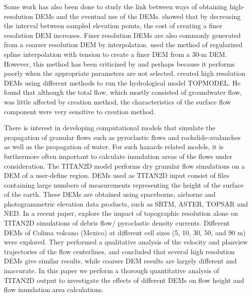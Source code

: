 \documentclass[12pt,letterpaper]{article}
\begin{document}
Some work has also been done to study the link between ways of
obtaining high-resolution DEMs and the eventual use of the
DEMs. \citet{Cochrane1999} showed that by decreasing the interval
between sampled elevation points, the cost of creating a finer
resolution DEM increases.  Finer resolution DEMs are also commonly
generated from a coarser resolution DEM by interpolation.
\citet{Mitasova1996} used the method of regularized spline
interpolation with tension to create a finer DEM from a 30-m
DEM. However, this method has been criticized by \citet{Zhang1994} and
\citet{Desmet1997} perhaps because it performs poorly when the
  appropriate parameters are not selected.  \citet{Wise2007} created
high resolution DEMs using different methods to run the hydrological
model TOPMODEL. He found that although the total flow, which mostly
consisted of groundwater flow, was little affected by creation method,
the characteristics of the surface flow component were very sensitive
to creation method.
 
There is interest in developing computational models that simulate the
propagation of granular flows such as pyroclastic flows and
rockslide-avalanches as well as the propagation of water.  For such
hazards related models, it is furthermore often important to calculate
inundation areas of the flows under consideration. The TITAN2D model
\citep{Patra2005} performs dry granular flow simulations on a DEM of a
user-define region. DEMs used as TITAN2D input consist of files
containing large numbers of measurements representing the height of
the surface of the earth. These DEMs are obtained using spaceborne,
airborne and photogrammetric elevation data products, such as SRTM,
ASTER, TOPSAR and NED.
In a recent paper,  \citep{Capra2011}  explore the impact of  
topographic resolution alone on TITAN2D simulations of debris flow/
pyroclastic density currents.  Different DEMs of Colima volcano (Mexico)
 at different cell sizes (5, 10, 30, 50, and 90 m) were explored. They performed a qualitative analysis
of  the  velocity and planview trajectories of the flow centerlines, and concluded
that several high resolution DEMs give similar results, while coarser DEM results
are largely different and inaccurate. In this paper we perform a thorough quantitative analysis  of
TITAN2D output to investigate the effects of different DEMs on flow height and flow inundation area calculations.
\end{document}
